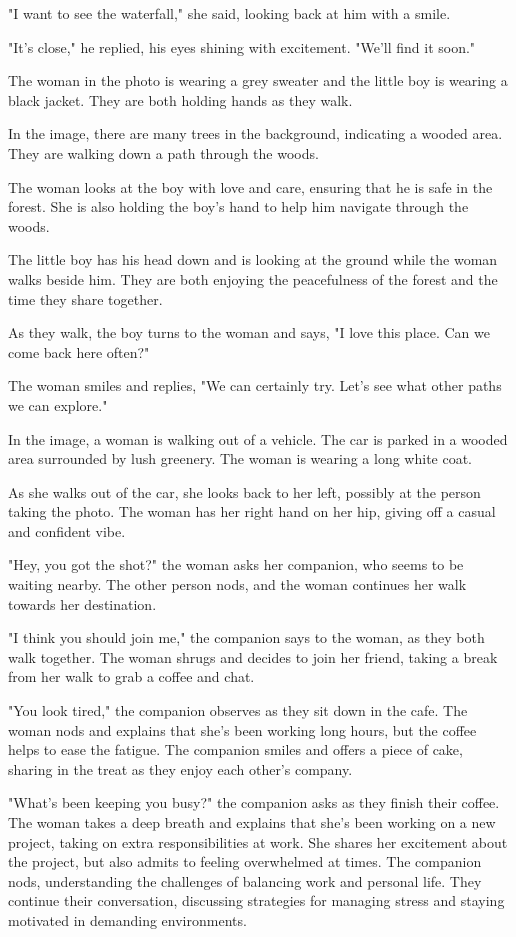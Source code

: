 \documentclass[smalldemyvopaper,11pt,twoside,onecolumn,openright,extrafontsizes]{memoir}
\begin{document}
"I want to see the waterfall," she said, looking back at him with a smile.\par
"It's close," he replied, his eyes shining with excitement. "We'll find it soon."\par
The woman in the photo is wearing a grey sweater and the little boy is wearing a black jacket. They are both holding hands as they walk.\par
In the image, there are many trees in the background, indicating a wooded area. They are walking down a path through the woods.\par
The woman looks at the boy with love and care, ensuring that he is safe in the forest. She is also holding the boy's hand to help him navigate through the woods.\par
The little boy has his head down and is looking at the ground while the woman walks beside him. They are both enjoying the peacefulness of the forest and the time they share together.\par
As they walk, the boy turns to the woman and says, "I love this place. Can we come back here often?"\par
The woman smiles and replies, "We can certainly try. Let's see what other paths we can explore."\par
In the image, a woman is walking out of a vehicle. The car is parked in a wooded area surrounded by lush greenery. The woman is wearing a long white coat.\par
As she walks out of the car, she looks back to her left, possibly at the person taking the photo. The woman has her right hand on her hip, giving off a casual and confident vibe.\par
"Hey, you got the shot?" the woman asks her companion, who seems to be waiting nearby. The other person nods, and the woman continues her walk towards her destination.\par
"I think you should join me," the companion says to the woman, as they both walk together. The woman shrugs and decides to join her friend, taking a break from her walk to grab a coffee and chat.\par
"You look tired," the companion observes as they sit down in the cafe. The woman nods and explains that she's been working long hours, but the coffee helps to ease the fatigue. The companion smiles and offers a piece of cake, sharing in the treat as they enjoy each other's company.\par
"What's been keeping you busy?" the companion asks as they finish their coffee. The woman takes a deep breath and explains that she's been working on a new project, taking on extra responsibilities at work. She shares her excitement about the project, but also admits to feeling overwhelmed at times. The companion nods, understanding the challenges of balancing work and personal life. They continue their conversation, discussing strategies for managing stress and staying motivated in demanding environments.\par
\end{document}
